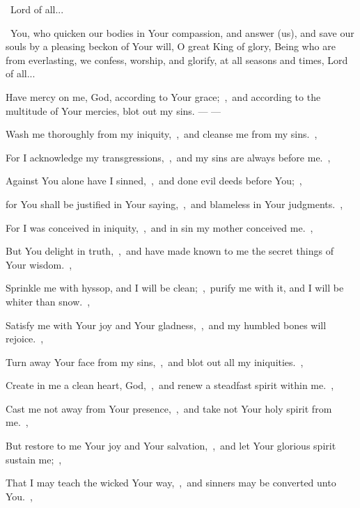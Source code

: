 \documentclass[12pt,twoside,a5paper]{article}
\begin{document}
\rr~Lord of all...


\cc~You, who quicken our bodies in Your compassion, and answer (us), and save our souls by a pleasing beckon of Your will, O great King of glory, Being who are from everlasting, we confess, worship, and glorify, at all seasons and times, Lord of all...



\begin{halfparskip}
  Have mercy on me, God, according to Your grace;~\sep\ and according to the multitude of Your mercies, blot out my sins. ---  --- 

  Wash me thoroughly from my iniquity,~\sep\ and cleanse me from my sins.~\sep

  For I acknowledge my transgressions,~\sep\ and my sins are always before me.~\sep

  Against You alone have I sinned,~\sep\ and done evil deeds before You;~\sep

  for You shall be justified in Your saying,~\sep\ and blameless in Your judgments.~\sep

  For I was conceived in iniquity,~\sep\ and in sin my mother conceived me.~\sep

  But You delight in truth,~\sep\ and have made known to me the secret things of Your wisdom.~\sep

  Sprinkle me with hyssop, and I will be clean;~\sep\ purify me with it, and I will be whiter than snow.~\sep

  Satisfy me with Your joy and Your gladness,~\sep\ and my humbled bones will rejoice.~\sep

  Turn away Your face from my sins,~\sep\ and blot out all my iniquities.~\sep

  Create in me a clean heart, God,~\sep\ and renew a steadfast spirit within me.~\sep

  Cast me not away from Your presence,~\sep\ and take not Your holy spirit from me.~\sep

  But restore to me Your joy and Your salvation,~\sep\ and let Your glorious spirit sustain me;~\sep

  That I may teach the wicked Your way,~\sep\ and sinners may be converted unto You.~\sep


\end{halfparskip}
\end{document}
